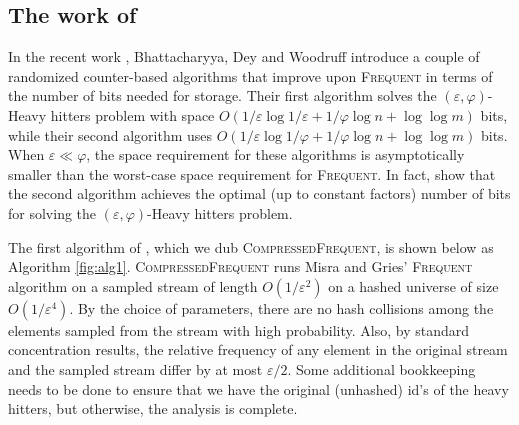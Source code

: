 \documentclass[sigconf,review=true,anonymous=true,screen]{acmart}
\newcommand{\eps}{\varepsilon}
\renewcommand{\phi}{\varphi}
\begin{document}
\subsection{The work of \cite{BDW16}}\label{sec:bdw}
In the recent work \cite{BDW16}, Bhattacharyya, Dey and Woodruff introduce a couple of randomized counter-based algorithms that improve upon \textsc{Frequent} in terms of the number of bits needed for storage. Their first algorithm solves the $(\eps,\phi)$-Heavy hitters problem with space $O(1/\eps \log 1/\eps + 1/\phi \log n + \log \log m)$ bits, while their second algorithm uses $O(1/\eps \log 1/\phi + 1/\phi \log n + \log \log m)$ bits. When $\eps \ll \phi$, the space requirement for these algorithms is asymptotically smaller than the worst-case space requirement for \textsc{Frequent}. In fact, \cite{BDW16} show that the second algorithm achieves the optimal (up to constant factors) number of bits for solving the $(\eps, \phi)$-Heavy hitters problem.

The first algorithm of \cite{BDW16}, which we dub \textsc{CompressedFrequent}, is shown below as Algorithm \ref{fig:alg1}. \textsc{CompressedFrequent} runs Misra and Gries' \textsc{Frequent} algorithm on a sampled stream of length $O(1/\eps^2)$ on a hashed universe of size $O(1/\eps^4)$. By the choice of parameters, there are no hash collisions among the elements sampled from the stream with high probability. Also, by standard concentration results, the relative frequency of any element in the original stream and the sampled stream differ by at most $\eps/2$. Some additional bookkeeping needs to be done to ensure that we have the original (unhashed) id's of the heavy hitters, but otherwise, the analysis is complete.
\end{document}

